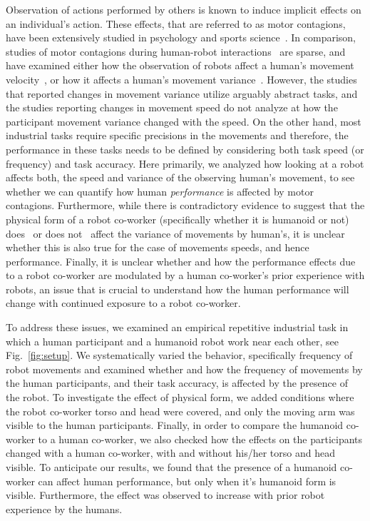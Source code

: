 Observation of actions performed by others is known to induce implicit effects on an individual's action. These effects, that are referred to as motor contagions, have been extensively studied in psychology and sports science~\cite{heyes2011automatic,Blakemore:Neuropsychologia:2005,Becchio:BJN:2007,Ganesh:Springer:2015,Ikegami:SciReport:2014,Hillebrandt:SciReports:2014,Chaminade:BRB:2008,Oztop:RAS_ICHR:2004,Kilner:CurBio:2003,Sciutti:IJSR:2012}. In comparison, studies of motor contagions during human-robot interactions~\cite{Vasalya:roman:2018} are sparse, and have examined either how the observation of robots affect a human's movement velocity~\cite{Noy:B&C:2009,Kilner:SocialNeuro:2007,Bisio:PlosOne:2010,Bisio:PlosOne:2014}, or how it affects a human's movement variance~\cite{Kupferberg:Methods:2009,Kupferberg:PlosOne:2012,Brass:ActaPsych:2001,Press:CBR:2005}. However, the studies that reported changes in movement variance utilize arguably abstract tasks, and the studies reporting changes in movement speed do not analyze at how the participant movement variance changed with the speed. On the other hand, most industrial tasks require specific precisions in the movements and therefore, the performance in these tasks needs to be defined by considering both task speed (or frequency) and task accuracy. Here primarily, we analyzed how looking at a robot affects both, the speed and variance of the observing human's movement, to see whether we can quantify how human \textit{performance} is affected by motor contagions.  
Furthermore, while there is contradictory evidence to suggest that the physical form of a robot co-worker (specifically whether it is humanoid or not) does~\cite{Chaminade:JPP:2009} or does not~\cite{Kupferberg:PlosOne:2012} affect the variance of movements by human's, it is unclear whether this is also true for the case of movements speeds, and hence performance. Finally, it is unclear whether and how the performance effects due to a robot co-worker are modulated by a human co-worker's prior experience with robots, an issue that is crucial to understand how the human performance will change with continued exposure to a robot co-worker.


To address these issues, we examined an empirical repetitive industrial task in which a human participant and a humanoid robot work near each other, see Fig.~\ref{fig:setup}. We systematically varied the behavior, specifically frequency of robot movements and examined whether and how the frequency of movements by the human participants, and their task accuracy, is affected by the presence of the robot. To investigate the effect of physical form, we added conditions where the robot co-worker torso and head were covered, and only the moving arm was visible to the human participants. Finally, in order to compare the humanoid co-worker to a human co-worker, we also checked how the effects on the participants changed with a human co-worker, with and without his/her torso and head visible. To anticipate our results, we found that the presence of a humanoid co-worker can affect human performance, but only when it's humanoid form is visible. Furthermore, the effect was observed to increase with prior robot experience by the humans.

